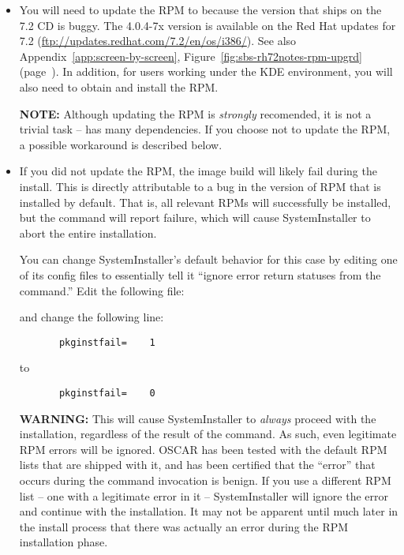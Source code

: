 \begin{itemize}
\item You will need to update the  RPM to
   because the version that ships on the 7.2 CD is
  buggy.  The 4.0.4-7x version is available on the Red Hat updates for
  7.2 (\url{ftp://updates.redhat.com/7.2/en/os/i386/}).  See also
  Appendix~\ref{app:screen-by-screen},
  Figure~\ref{fig:sbs-rh72notes-rpm-upgrd}
  (page~\pageref{fig:sbs-rh72notes-rpm-upgrd}). In addition, for users
  working under the KDE environment, you will also need to obtain and
  install the  RPM.
  
  {\bf NOTE:} Although updating the  RPM is {\em
    strongly} recomended, it is not a trivial task -- 
  has many dependencies.  If you choose not to update the
   RPM, a possible workaround is described below.
  
\item If you did not update the  RPM, the image build
  will likely fail during the install.  This is directly attributable
  to a bug in the version of RPM that is installed by default.  That
  is, all relevant RPMs will successfully be installed, but the
   command will report failure, which will cause
  SystemInstaller to abort the entire installation.  

  You can change SystemInstaller's default behavior for this case by
  editing one of its config files to essentially tell it ``ignore
  error return statuses from the  command.''  Edit the
  following file:

  \vspace{11pt}
  \centerline{}
  \vspace{11pt}

  and change the following line:

\begin{verbatim}
       pkginstfail=    1
\end{verbatim}
  to
\begin{verbatim}
       pkginstfail=    0
\end{verbatim}
  
  {\bf WARNING:} This will cause SystemInstaller to {\em always}
  proceed with the installation, regardless of the result of the
   command.  As such, even legitimate RPM errors will be
  ignored.  OSCAR has been tested with the default RPM lists that are
  shipped with it, and has been certified that the ``error'' that
  occurs during the  command invocation is benign.  If you
  use a different RPM list -- one with a legitimate error in it --
  SystemInstaller will ignore the error and continue with the
  installation.  It may not be apparent until much later in the
  install process that there was actually an error during the RPM
  installation phase.
\end{itemize}

